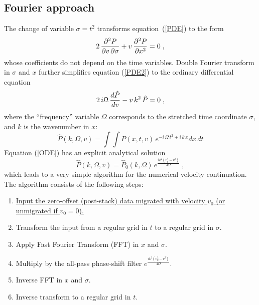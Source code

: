\par
\subsection{Fourier approach}
\par
The change of variable $\sigma = t^2$ transforms
equation~(\ref{PDE}) to the form
\begin{equation}
  \label{PDE2}
  2\,{{\partial^2 P} \over {\partial v\, \partial \sigma}} +
  v\,{{\partial^2 P} \over {\partial x^2}} = 0\;,
\end{equation}
whose coefficients do not depend on the time variables.  Double Fourier
transform in $\sigma$ and $x$ further simplifies equation (\ref{PDE2})
to the ordinary differential equation
\begin{equation}
  \label{ODE}
  2\,i\Omega\,{{d \hat{P}} \over {d v}} -
  v\,k^2\,\hat{P} = 0\;,
\end{equation}
where the ``frequency'' variable $\Omega$ corresponds to the stretched time
coordinate $\sigma$, and $k$ is the wavenumber in $x$:
\begin{equation}
\label{FFT}
\hat{P}(k,\Omega,v) = \int\!\!\int P(x,t,v)\,
e^{-i\,\Omega\,t^2 + i\,k\,x} d x\,dt
\end{equation}
Equation (\ref{ODE}) has
an explicit analytical solution
\begin{equation}
  \label{ODEsol}
  \hat{P} (k,\Omega,v) = \hat{P}_0 (k,\Omega)\,
  e^{\frac{i k^2(v_0^2-v^2)}{4\Omega}}\;,
\end{equation}
which leads to a very simple algorithm for the numerical velocity
continuation. The algorithm consists of the following steps:
\begin{enumerate}
\item \uline{Input the zero-offset (post-stack) data migrated with velocity $v_0$ (or
  unmigrated if $v_0=0$).}
\item Transform the input from a regular grid in $t$ to a regular grid
  in $\sigma$.
\item Apply Fast Fourier Transform (FFT) in $x$ and $\sigma$.
\item Multiply by the all-pass phase-shift filter $e^{\frac{i
      k^2(v_0^2-v^2)}{4\Omega}}$.
\item Inverse FFT in $x$ and $\sigma$.
\item Inverse transform to a regular grid in $t$.
\end{enumerate}


